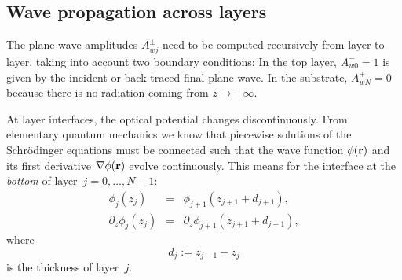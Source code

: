 \subsection{Wave propagation across layers}\label{Sacrolay}

%
%
%

The plane-wave amplitudes $A^\pm_{wj}$ need to be computed recursively
from layer to layer,
taking into account two boundary conditions:
In the top layer, $A^-_{w0}=1$ is given by the
incident or back-traced final plane wave.
In the substrate, $A^+_{wN}=0$ because there is no radiation
coming from $z\to-\infty$.

At layer interfaces, the optical potential changes discontinuously.
From elementary quantum mechanics we know that
piecewise solutions of the Schrödinger equations must be connected
such that the wave function $\phi(\mathbf{r})$ and its first derivative
$\mathbf{\nabla}\phi(\mathbf{r})$ evolve continuously.
This means for the interface
at the \textit{bottom} of layer~$j=0,\ldots,N-1$:%
\begin{equation}\label{Econtcond}
  \begin{array}{lcl}
            \phi_j(z_j)&=&\phi_{j+1}(z_{j+1}+d_{j+1}),\\
            \partial_z\phi_j(z_j)&=&\partial_z\phi_{j+1}(z_{j+1}+d_{j+1}),
  \end{array}
\end{equation}
  where
\begin{equation}
  d_j:=z_{j-1}-z_{j}
\end{equation}
is the thickness of layer~$j$.

